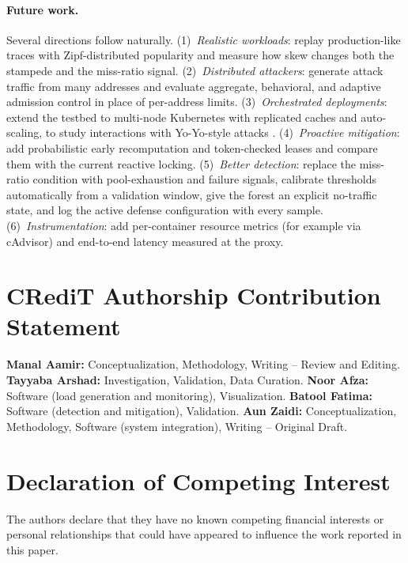 \documentclass[preprint,12pt]{elsarticle}
\begin{document}
\paragraph{Future work.} Several directions follow naturally. (1)~\emph{Realistic
workloads}: replay production-like traces with Zipf-distributed popularity and
measure how skew changes both the stampede and the miss-ratio signal. (2)~\emph{Distributed
attackers}: generate attack traffic from many addresses and evaluate aggregate,
behavioral, and adaptive admission control \cite{welsh2003,ranjan2009} in place of
per-address limits. (3)~\emph{Orchestrated deployments}: extend the testbed to
multi-node Kubernetes with replicated caches and auto-scaling, to study interactions
with Yo-Yo-style attacks \cite{sides2016,bremlerbarr2017}. (4)~\emph{Proactive
mitigation}: add probabilistic early recomputation \cite{vattani2015} and token-checked
leases \cite{kleppmann2016} and compare them with the current reactive locking.
(5)~\emph{Better detection}: replace the miss-ratio condition with pool-exhaustion and
failure signals, calibrate thresholds automatically from a validation window, give the
forest an explicit no-traffic state, and log the active defense configuration with
every sample. (6)~\emph{Instrumentation}: add per-container resource metrics (for
example via cAdvisor) and end-to-end latency measured at the proxy.


\section*{CRediT Authorship Contribution Statement}
\textbf{Manal Aamir:} Conceptualization, Methodology, Writing -- Review and Editing.
\textbf{Tayyaba Arshad:} Investigation, Validation, Data Curation.
\textbf{Noor Afza:} Software (load generation and monitoring), Visualization.
\textbf{Batool Fatima:} Software (detection and mitigation), Validation.
\textbf{Aun Zaidi:} Conceptualization, Methodology, Software (system integration),
Writing -- Original Draft.

\section*{Declaration of Competing Interest}
The authors declare that they have no known competing financial interests or personal
relationships that could have appeared to influence the work reported in this paper.
\end{document}
